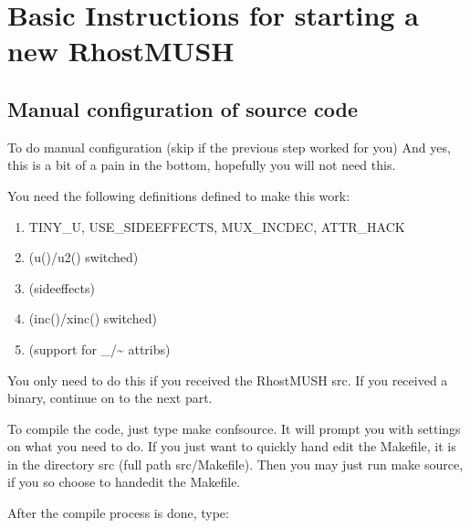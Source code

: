 \documentclass[letterpaper,10pt,english]{sphinxmanual}
\begin{document}
\section{Basic Instructions for starting a new RhostMUSH}
\label{\detokenize{install:basic-instructions-for-starting-a-new-rhostmush}}

\subsection{Manual configuration of source code}
\label{\detokenize{install:manual-configuration-of-source-code}}
\sphinxAtStartPar
To do manual configuration (skip if the previous step worked for you) And yes, this is a bit of a pain in the bottom, hopefully you will not need this.

\sphinxAtStartPar
You need the following definitions defined to make this work:
\begin{enumerate}
%
\item {} 
\sphinxAtStartPar
TINY\_U, USE\_SIDEEFFECTS, MUX\_INCDEC, ATTR\_HACK

\item {} 
\sphinxAtStartPar
(u()/u2() switched)

\item {} 
\sphinxAtStartPar
(sideeffects)

\item {} 
\sphinxAtStartPar
(inc()/xinc() switched)

\item {} 
\sphinxAtStartPar
(support for \_/\textasciitilde{} attribs)

\end{enumerate}

\sphinxAtStartPar
You only need to do this if you received the RhostMUSH src.  If you received a binary, continue on to the next part.

\sphinxAtStartPar
To compile the code, just type \textquotesingle{}make confsource\textquotesingle{}.  It will prompt you with settings on what you need to do.  If you just want to quickly hand edit the Makefile, it is in the directory src (full path src/Makefile).  Then you may just run \textquotesingle{}make source\textquotesingle{}, if you so choose to hand\sphinxhyphen{}edit the Makefile.

\sphinxAtStartPar
After the compile process is done, type:

\begin{sphinxVerbatim}[commandchars=\\\{\}]
 
\end{sphinxVerbatim}
\end{document}
